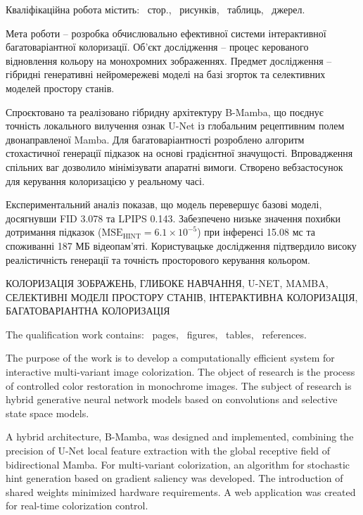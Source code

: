 
\abstractUkr

    Кваліфікаційна робота містить: \pageref{LastPage}~стор., \totfig~рисунків, \tottab~таблиць, \totbib~джерел.

    Мета роботи -- розробка обчислювально ефективної системи інтерактивної багатоваріантної колоризації.
    Об'єкт дослідження -- процес керованого відновлення кольору на монохромних зображеннях.
    Предмет дослідження -- гібридні генеративні нейромережеві моделі на базі згорток та селективних моделей простору станів.

    Спроєктовано та реалізовано гібридну архітектуру B-Mamba, що поєднує точність локального вилучення ознак U-Net із глобальним рецептивним полем двонаправленої Mamba.
    Для багатоваріантності розроблено алгоритм стохастичної генерації підказок на основі градієнтної значущості.
    Впровадження спільних ваг дозволило мінімізувати апаратні вимоги.
    Створено вебзастосунок для керування колоризацією у реальному часі.

    Експериментальний аналіз показав, що модель перевершує базові моделі, досягнувши FID 3.078 та LPIPS 0.143.
    Забезпечено низьке значення похибки дотримання підказок ($\mathrm{MSE}_{\mathrm{HINT}} = 6.1 \times 10^{-5}$) при інференсі 15.08 мс та споживанні 187 МБ відеопам'яті.
    Користувацьке дослідження підтвердило високу реалістичність генерації та точність просторового керування кольором.

    \MakeUppercase{КОЛОРИЗАЦІЯ ЗОБРАЖЕНЬ, ГЛИБОКЕ НАВЧАННЯ, U-NET, MAMBA, СЕЛЕКТИВНІ МОДЕЛІ ПРОСТОРУ СТАНІВ, ІНТЕРАКТИВНА КОЛОРИЗАЦІЯ, БАГАТОВАРІАНТНА КОЛОРИЗАЦІЯ}


\abstractEng

    The qualification work contains: \pageref{LastPage}~pages, \totfig~figures, \tottab~tables, \totbib~references.

    The purpose of the work is to develop a computationally efficient system for interactive multi-variant image colorization.
    The object of research is the process of controlled color restoration in monochrome images.
    The subject of research is hybrid generative neural network models based on convolutions and selective state space models.

    A hybrid architecture, B-Mamba, was designed and implemented, combining the precision of U-Net local feature extraction with the global receptive field of bidirectional Mamba.
    For multi-variant colorization, an algorithm for stochastic hint generation based on gradient saliency was developed.
    The introduction of shared weights minimized hardware requirements.
    A web application was created for real-time colorization control.

